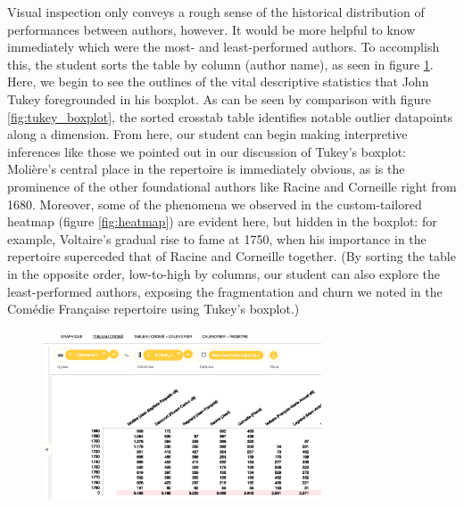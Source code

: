 \documentclass[	DIV=calc,%
							paper=a4,%
							fontsize=11pt,%
							twocolumn]{scrartcl}	 					%
\begin{document}
Visual inspection only conveys a rough sense of the historical distribution of performances between authors, however.  It would be more helpful to know immediately which were the most- and least-performed authors.  To accomplish this, the student sorts the table by column (author name), as seen in figure \ref{fig:sorted}.  Here, we begin to see the outlines of the vital descriptive statistics that John Tukey foregrounded in his boxplot.  As can be seen by comparison with figure \ref{fig:tukey_boxplot}, the sorted crosstab table identifies notable outlier datapoints along a dimension.  From here, our student can begin making interpretive inferences like those we pointed out in our discussion of Tukey’s boxplot: Molière’s central place in the repertoire is immediately obvious, as is the prominence of the other foundational authors like Racine and Corneille right from 1680.  Moreover, some of the phenomena we observed in the custom-tailored heatmap (figure \ref{fig:heatmap}) are evident here, but hidden in the boxplot: for example, Voltaire’s gradual rise to fame at 1750, when his importance in the repertoire superceded that of Racine and Corneille together.  (By sorting the table in the opposite order, low-to-high by columns, our student can also explore the least-performed authors, exposing  the fragmentation and churn we noted in the Comédie Française repertoire using Tukey’s boxplot.)

\begin{figure}
  \centering
	\includegraphics[width=3.25in]{steps/sorted.png}
	\caption{}
	\label{fig:sorted}
\end{figure}
\end{document}

